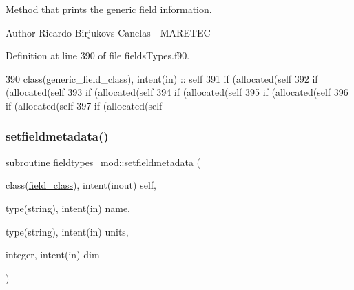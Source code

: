 Method that prints the generic field information. 

\begin{DoxyAuthor}{Author}
Ricardo Birjukovs Canelas -\/ M\+A\+R\+E\+T\+EC 
\end{DoxyAuthor}


Definition at line 390 of file fields\+Types.\+f90.


\begin{DoxyCode}
390     \textcolor{keywordtype}{class}(generic\_field\_class), \textcolor{keywordtype}{intent(in)} :: self
391     \textcolor{keywordflow}{if} (\textcolor{keyword}{allocated}(self%
392     \textcolor{keywordflow}{if} (\textcolor{keyword}{allocated}(self%
393     \textcolor{keywordflow}{if} (\textcolor{keyword}{allocated}(self%
394     \textcolor{keywordflow}{if} (\textcolor{keyword}{allocated}(self%
395     \textcolor{keywordflow}{if} (\textcolor{keyword}{allocated}(self%
396     \textcolor{keywordflow}{if} (\textcolor{keyword}{allocated}(self%
397     \textcolor{keywordflow}{if} (\textcolor{keyword}{allocated}(self%
\end{DoxyCode}
\mbox{\label{namespacefieldtypes__mod_abc601ce9f8a974f426e876cc4c02e2a2}} 
\subsubsection{\texorpdfstring{setfieldmetadata()}{setfieldmetadata()}}
{\footnotesize\ttfamily subroutine fieldtypes\+\_\+mod\+::setfieldmetadata (\begin{DoxyParamCaption}\item[{class(\mbox{\hyperlink{structfieldtypes__mod_1_1field__class}{field\+\_\+class}}), intent(inout)}]{self,  }\item[{type(string), intent(in)}]{name,  }\item[{type(string), intent(in)}]{units,  }\item[{integer, intent(in)}]{dim }\end{DoxyParamCaption})\hspace{0.3cm}{\ttfamily [private]}}



